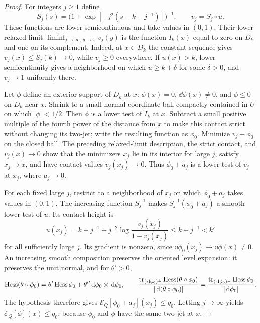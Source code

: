 \begin{proof}
For integers $j\ge1$ define
\begin{equation}\label{n3:apriori:sigmoid}
 S_j(s)=\bigl(1+\exp[-j^2(s-k-j^{-1})]\bigr)^{-1},
 \qquad v_j=S_j\circ u.
\end{equation}
These functions are lower semicontinuous and take values in $(0,1)$.
Their lower relaxed limit $\liminf_{j\to\infty,\,y\to x}v_j(y)$
is the function $I_k(x)$ equal to zero on $D_k$ and one on its
complement.  Indeed, at $x\in D_k$ the constant
sequence gives $v_j(x)\le S_j(k)\to0$, while $v_j\ge0$ everywhere.
If $u(x)>k$, lower semicontinuity gives a neighborhood on which
$u\ge k+\delta$ for some $\delta>0$, and $v_j\to1$ uniformly there.

Let $\phi$ define an exterior support of $D_k$ at $x$:
$\phi(x)=0$, $\dd\phi(x)\ne0$, and $\phi\le0$ on $D_k$ near $x$.
Shrink to a small normal-coordinate ball compactly contained in $U$ on which
$|\phi|<1/2$.  Then $\phi$ is a lower test of $I_k$ at $x$.
Subtract a small positive multiple of the fourth power of the distance
from $x$ to make this contact strict without changing its two-jet;
write the resulting function as $\phi_0$.
Minimize $v_j-\phi_0$ on the closed ball.  The preceding relaxed-limit
description, the strict contact, and $v_j(x)\to0$ show that the
minimizers $x_j$ lie in its interior for large $j$, satisfy $x_j\to x$,
and have contact values $v_j(x_j)\to0$.  Thus $\phi_0+a_j$ is a
lower test of $v_j$ at $x_j$, where $a_j\to0$.

For each fixed large $j$, restrict to a neighborhood of $x_j$ on
which $\phi_0+a_j$ takes values in $(0,1)$.  The increasing function
$S_j^{-1}$ makes $S_j^{-1}(\phi_0+a_j)$ a smooth lower test of $u$.
Its contact height is
\[
 u(x_j)=k+j^{-1}
       +j^{-2}\log\frac{v_j(x_j)}{1-v_j(x_j)}
       \le k+j^{-1}<k'
\]
for all sufficiently large $j$.  Its gradient is nonzero, since
$\dd\phi_0(x_j)\to\dd\phi(x)\ne0$.
An increasing smooth composition preserves the oriented level expansion:
it preserves the unit normal, and for $\theta'>0$,
\[
 \operatorname{Hess}(\theta\circ\phi_0)
  =\theta'\operatorname{Hess}\phi_0
       +\theta''\,\mathrm d\phi_0\otimes\,\mathrm d\phi_0,
 \qquad
 \frac{\operatorname{tr}_{(\,\mathrm d\phi_0)^\perp}\operatorname{Hess}(\theta\circ\phi_0)}
 {|\,\mathrm d(\theta\circ\phi_0)|}
 =\frac{\operatorname{tr}_{(\,\mathrm d\phi_0)^\perp}\operatorname{Hess}\phi_0}{|\,\mathrm d\phi_0|}.
\]
The hypothesis therefore gives
$\mathcal E_Q[\phi_0+a_j](x_j)\le q_0$.
Letting $j\to\infty$ yields $\mathcal E_Q[\phi](x)\le q_0$,
because $\phi_0$ and $\phi$ have the same two-jet at $x$.
\end{proof}

